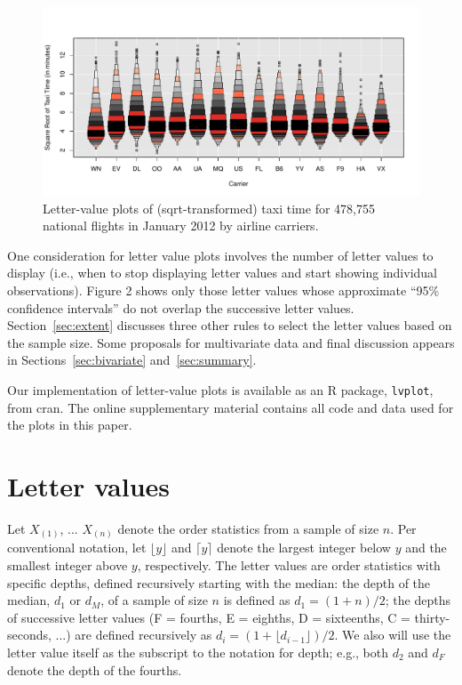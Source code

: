 \documentclass[12pt,oneside]{article}
\begin{document}
\begin{figure}[hbtp]
  \centering
  \includegraphics[width=\linewidth]{taxi-lv}

  \caption{Letter-value plots of (sqrt-transformed) taxi time for 478,755 national flights in January 2012 by airline carriers.}

  \label{fig:taxi-lv} 
\end{figure}

One consideration for letter value plots involves the number of letter values to display (i.e., when to stop displaying letter values and start showing individual observations). Figure 2 shows only those letter values whose approximate ``95\% confidence intervals'' do not overlap the successive letter values. Section~\ref{sec:extent} discusses three other rules to select the letter values based on the sample size. Some proposals for multivariate data and final discussion appears in Sections~\ref{sec:bivariate} and~\ref{sec:summary}.

Our implementation of letter-value plots is available as an R package, \texttt{lvplot}, from {\sc cran}. The online supplementary material contains all code and data used for the plots in this paper.

\section{Letter values}
\label{sec:letter-values}

Let $X_{(1)}$, ... $X_{(n)}$ denote the order statistics from a sample of size $n$. Per conventional notation, let $\lfloor y \rfloor$ and $\lceil y \rceil$ denote the largest integer below $y$ and the smallest integer above $y$, respectively. The letter values are  order statistics with specific depths, defined recursively starting with the median:
the depth of the median, $d_1$ or $d_M$, of a sample of size $n$ is defined as $d_1 = (1 + n )/2$; the depths of successive letter values (F = fourths, E = eighths, D = sixteenths, C = thirty-seconds, ...) are defined recursively as $d_i = (1 + \lfloor d_{i-1} \rfloor)/2$. We also will use the letter value itself as the subscript to the notation for depth; e.g., both $d_2$ and $d_F$ denote the depth of the fourths. 
\end{document}
